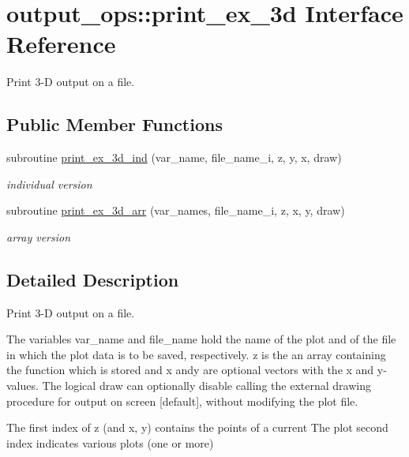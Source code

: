 \hypertarget{interfaceoutput__ops_1_1print__ex__3d}{}\section{output\+\_\+ops\+:\+:print\+\_\+ex\+\_\+3d Interface Reference}
\label{interfaceoutput__ops_1_1print__ex__3d}


Print 3-\/D output on a file.  


\subsection*{Public Member Functions}
\begin{DoxyCompactItemize}
\item 
subroutine \hyperlink{interfaceoutput__ops_1_1print__ex__3d_aa1665ffffbfabae84fc372d5f138456b}{print\+\_\+ex\+\_\+3d\+\_\+ind} (var\+\_\+name, file\+\_\+name\+\_\+i, z, y, x, draw)
\begin{DoxyCompactList}\small\item\em individual version \end{DoxyCompactList}\item 
subroutine \hyperlink{interfaceoutput__ops_1_1print__ex__3d_af4a49d03579403f42201d7ce503fa465}{print\+\_\+ex\+\_\+3d\+\_\+arr} (var\+\_\+names, file\+\_\+name\+\_\+i, z, x, y, draw)
\begin{DoxyCompactList}\small\item\em array version \end{DoxyCompactList}\end{DoxyCompactItemize}


\subsection{Detailed Description}
Print 3-\/D output on a file. 

The variables {\ttfamily var\+\_\+name} and {\ttfamily file\+\_\+name} hold the name of the plot and of the file in which the plot data is to be saved, respectively. {\ttfamily z} is the an array containing the function which is stored and {\ttfamily x} and{\ttfamily y} are optional vectors with the x and y-\/values. The logical {\ttfamily draw} can optionally disable calling the external drawing procedure for output on screen \mbox{[}default\mbox{]}, without modifying the plot file.

The first index of {\ttfamily z} (and {\ttfamily x}, {\ttfamily y}) contains the points of a current The plot second index indicates various plots (one or more) 

